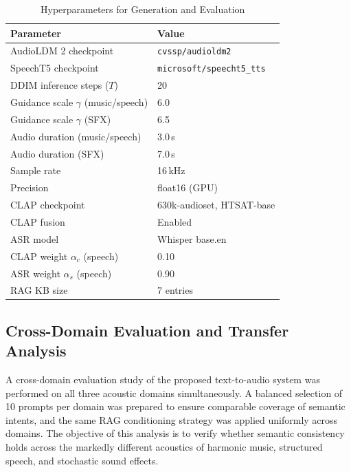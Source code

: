 \documentclass[journal]{IEEEtran}
\begin{document}
\begin{table}[!t]
  \renewcommand{\arraystretch}{1.3}
  \caption{Hyperparameters for Generation and Evaluation}
  \label{tab:hyperparams}
  \centering
  \begin{tabular}{|l|l|}
  \hline
  \textbf{Parameter} & \textbf{Value} \\
  \hline
  AudioLDM 2 checkpoint        & \texttt{cvssp/audioldm2} \\
  SpeechT5 checkpoint          & \texttt{microsoft/speecht5\_tts} \\
  DDIM inference steps ($T$)   & 20 \\
  Guidance scale $\gamma$ (music/speech) & 6.0 \\
  Guidance scale $\gamma$ (SFX)          & 6.5 \\
  Audio duration (music/speech) & 3.0\,s \\
  Audio duration (SFX)         & 7.0\,s \\
  Sample rate                  & 16\,kHz \\
  Precision                    & float16 (GPU) \\
  CLAP checkpoint              & 630k-audioset, HTSAT-base \\
  CLAP fusion                  & Enabled \\
  ASR model                    & Whisper base.en \\
  CLAP weight $\alpha_c$ (speech) & 0.10 \\
  ASR weight $\alpha_s$ (speech) & 0.90 \\
  RAG KB size                  & 7 entries \\
  \hline
  \end{tabular}
\end{table}

\subsection{Cross-Domain Evaluation and Transfer Analysis}

A cross-domain evaluation study of the proposed text-to-audio system
was performed on all three acoustic domains simultaneously. A balanced
selection of 10 prompts per domain was prepared to ensure comparable
coverage of semantic intents, and the same RAG conditioning strategy
was applied uniformly across domains. The objective of this analysis
is to verify whether semantic consistency holds across the markedly
different acoustics of harmonic music, structured speech, and
stochastic sound effects.
\end{document}

